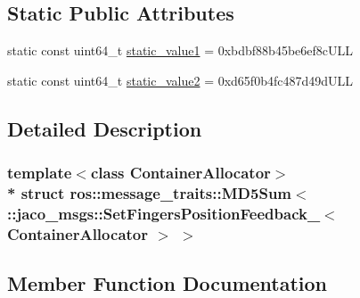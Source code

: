 \subsection*{Static Public Attributes}
\begin{DoxyCompactItemize}
\item 
static const uint64\+\_\+t \hyperlink{structros_1_1message__traits_1_1MD5Sum_3_01_1_1jaco__msgs_1_1SetFingersPositionFeedback___3_01ContainerAllocator_01_4_01_4_a52074f161eda9666dc3eac08148fad1e}{static\+\_\+value1} = 0xbdbf88b45be6ef8c\+U\+LL
\item 
static const uint64\+\_\+t \hyperlink{structros_1_1message__traits_1_1MD5Sum_3_01_1_1jaco__msgs_1_1SetFingersPositionFeedback___3_01ContainerAllocator_01_4_01_4_a15005f3d97042d08fd0c0627128b92d7}{static\+\_\+value2} = 0xd65f0b4fc487d49d\+U\+LL
\end{DoxyCompactItemize}


\subsection{Detailed Description}
\subsubsection*{template$<$class Container\+Allocator$>$\\*
struct ros\+::message\+\_\+traits\+::\+M\+D5\+Sum$<$ \+::jaco\+\_\+msgs\+::\+Set\+Fingers\+Position\+Feedback\+\_\+$<$ Container\+Allocator $>$ $>$}



\subsection{Member Function Documentation}
